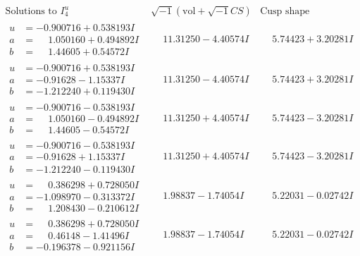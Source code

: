 \documentclass[1p]{elsarticle_modified}
\theoremstyle{definition}
\newcommand{\I}{\sqrt{-1}}
\begin{document}
$$\begin{array}{c|c|c}  
\text{Solutions to }I^u_{4}& \I (\text{vol} + \sqrt{-1}CS) & \text{Cusp shape}\\
 \hline 
\begin{aligned}
u &= -0.900716 + 0.538193 I \\
a &= \phantom{-}1.050160 + 0.494892 I \\
b &= \phantom{-}1.44605 + 0.54572 I\end{aligned}
 & \phantom{-}11.31250 - 4.40574 I & \phantom{-}5.74423 + 3.20281 I \\ \hline\begin{aligned}
u &= -0.900716 + 0.538193 I \\
a &= -0.91628 - 1.15337 I \\
b &= -1.212240 + 0.119430 I\end{aligned}
 & \phantom{-}11.31250 - 4.40574 I & \phantom{-}5.74423 + 3.20281 I \\ \hline\begin{aligned}
u &= -0.900716 - 0.538193 I \\
a &= \phantom{-}1.050160 - 0.494892 I \\
b &= \phantom{-}1.44605 - 0.54572 I\end{aligned}
 & \phantom{-}11.31250 + 4.40574 I & \phantom{-}5.74423 - 3.20281 I \\ \hline\begin{aligned}
u &= -0.900716 - 0.538193 I \\
a &= -0.91628 + 1.15337 I \\
b &= -1.212240 - 0.119430 I\end{aligned}
 & \phantom{-}11.31250 + 4.40574 I & \phantom{-}5.74423 - 3.20281 I \\ \hline\begin{aligned}
u &= \phantom{-}0.386298 + 0.728050 I \\
a &= -1.098970 - 0.313372 I \\
b &= \phantom{-}1.208430 - 0.210612 I\end{aligned}
 & \phantom{-}1.98837 - 1.74054 I & \phantom{-}5.22031 - 0.02742 I \\ \hline\begin{aligned}
u &= \phantom{-}0.386298 + 0.728050 I \\
a &= \phantom{-}0.46148 - 1.41496 I \\
b &= -0.196378 - 0.921156 I\end{aligned}
 & \phantom{-}1.98837 - 1.74054 I & \phantom{-}5.22031 - 0.02742 I \\ \hline\begin{aligned}

\end{aligned}
\end{array}$$
\end{document}
